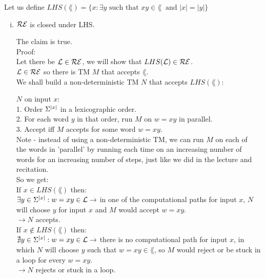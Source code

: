 Let us define $LHS(\lang) = \{x : \exists y \text{ such that } xy \in \lang\ \text{ and } |x| = |y|\}$

\begin{enumerate}[i.]
      \item $\mathcal{R}\mathcal{E}$ is closed under LHS.

            The claim is true. \\

            Proof: \\
            Let there be $\mathcal{L} \in \mathcal{R}\mathcal{E}$, we will show that $LHS(\mathcal{L}) \in \mathcal{R}\mathcal{E}$. \\
            $\mathcal{L} \in \mathcal{R}\mathcal{E}$ so there is TM $M$ that accepts $\lang$. \\
            We shall build a non-deterministic TM $N$ that accepts $LHS(\lang)$:

            $N \text{ on input } x$: \\
            1. Order $\Sigma^{|x|}$ in a lexicographic order. \\
            2. For each word $y$ in that order, run $M$ on $w=xy$ in parallel. \\
            3. Accept iff $M$ accepts for some word $w=xy$. \\

            Note - instead of using a non-deterministic TM, we can run $M$ on each of \\
            the words in 'parallel' by running each time on an increasing number of \\
            words for an increasing number of steps, just like we did in the lecture and recitation. \\

            So we get: \\
            If $x \in LHS(\lang)$ then: \\
            $\exists y \in \Sigma^{|x|}: w=xy \in \mathcal{L} \rightarrow $ in one of the computational
            paths for input $x$, $N$ will choose $y$ for input $x$ and $M$ would accept $w=xy$. \\
            $\rightarrow N$ accepts. \\

            If $x \notin LHS(\lang)$ then: \\
            $\nexists y \in \Sigma^{|x|}: w=xy \in \mathcal{L} \rightarrow $ there is no computational
            path for input $x$, in which $N$ will choose $y$ such that $w=xy \in \lang$,
            so $M$ would reject or be stuck in a loop for every $w=xy$. \\
            $\rightarrow N$ rejects or stuck in a loop. \\


\end{enumerate}
